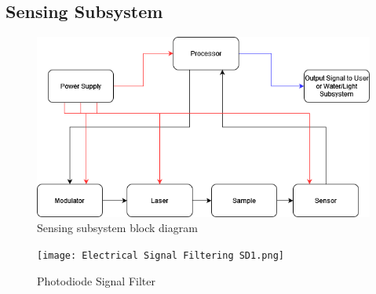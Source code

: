\subsection{Sensing Subsystem}
\begin{figure}[H]
    \caption{Sensing subsystem block diagram}
    \centering
    \includegraphics[width=\textwidth]{images/IRSensorBlockDiagram.png}
\end{figure}

\begin{figure}[H]
    \caption{Photodiode Signal Filter}
    \centering
    \texttt{[image: Electrical Signal Filtering SD1.png]}
\end{figure}